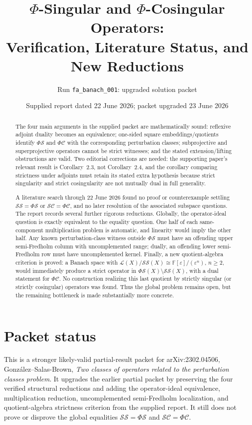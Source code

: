 \documentclass[11pt]{article}
\title{\(\Phi\)-Singular and \(\Phi\)-Cosingular Operators:\\
Verification, Literature Status, and New Reductions}
\author{Run \texttt{fa\_banach\_001}: upgraded solution packet}
\date{Supplied report dated 22 June 2026; packet upgraded 23 June 2026}
\theoremstyle{definition}
\newcommand{\Lop}{\mathcal L}
\newcommand{\SSing}{\mathcal{SS}}
\newcommand{\SCos}{\mathcal{SC}}
\newcommand{\PhiS}{\Phi\mathcal S}
\newcommand{\PhiC}{\Phi\mathcal C}
\newcommand{\F}{\mathbb F}
\begin{document}
\maketitle

\begin{abstract}
The four main arguments in the supplied packet are mathematically sound: reflexive
adjoint duality becomes an equivalence; one-sided square embeddings/quotients identify
\(\PhiS\) and \(\PhiC\) with the corresponding perturbation classes; subprojective and
superprojective operators cannot be strict witnesses; and the stated extension/lifting
obstructions are valid.  Two editorial corrections are needed: the supporting paper's
relevant result is Corollary~2.3, not Corollary~2.4, and the corollary comparing strictness
under adjoints must retain its stated extra hypothesis because strict singularity and strict
cosingularity are not mutually dual in full generality.

A literature search through 22 June 2026 found no proof or counterexample settling
\(\SSing=\PhiS\) or \(\SCos=\PhiC\), and no later resolution of the associated subspace
questions.  The report records several further rigorous reductions.  Globally, the
operator-ideal question is exactly equivalent to the equality question.  One half of each
same-component multiplication problem is automatic, and linearity would imply the other
half.  Any known perturbation-class witness outside \(\PhiS\) must have an offending
upper semi-Fredholm column with uncomplemented range; dually, an offending lower
semi-Fredholm row must have uncomplemented kernel.  Finally, a new quotient-algebra
criterion is proved: a Banach space with
\(\Lop(X)/\SSing(X)\cong\F[\varepsilon]/(\varepsilon^n)\), \(n\ge2\), would immediately
produce a strict operator in \(\PhiS(X)\setminus\SSing(X)\), with a dual statement for
\(\PhiC\).  No construction realizing this last quotient by strictly singular (or strictly
cosingular) operators was found.  Thus the global problem remains open, but the remaining
bottleneck is made substantially more concrete.
\end{abstract}

\section*{Packet status}

This is a stronger likely-valid partial-result packet for arXiv:2302.04506,
Gonz\'alez--Salas-Brown, \emph{Two classes of operators related to the perturbation
classes problem}.  It upgrades the earlier partial packet by preserving the four verified
structural reductions and adding the operator-ideal equivalence, multiplication reduction,
uncomplemented semi-Fredholm localization, and quotient-algebra strictness criterion
from the supplied report.  It still does not prove or disprove the global equalities
\(\SSing=\PhiS\) and \(\SCos=\PhiC\).
\end{document}
